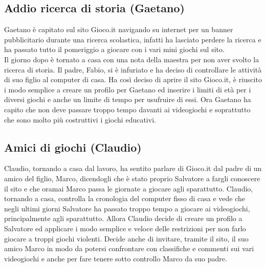 \documentclass[../Report.tex]{subfiles}
\begin{document}
    \subsection{Addio ricerca di storia (Gaetano)}
    Gaetano è capitato sul sito Gioco.it navigando su internet per un banner pubblicitario durante una ricerca scolastica, infatti ha lasciato perdere la ricerca e ha passato tutto il pomeriggio a giocare con i vari mini giochi sul sito.\\
    Il giorno dopo è tornato a casa con una nota della maestra per non aver svolto la ricerca di storia. Il padre, Fabio, si è infuriato e ha deciso di controllare le attività di suo figlio al computer di casa. Ha così deciso di aprire il sito Gioco.it, è riuscito i modo semplice a creare un profilo per Gaetano ed inserire i limiti di età per i diversi giochi e anche un limite di tempo per usufruire di essi. Ora Gaetano ha capito che non deve passare troppo tempo davanti ai videogiochi e soprattutto che sono molto più costruttivi i giochi educativi.

    \subsection{Amici di giochi (Claudio)}
    Claudio, tornando a casa dal lavoro, ha sentito parlare di Gioco.it dal padre di un amico del figlio, Marco, dicendogli che è stato proprio Salvatore a fargli conoscere il sito e che oramai Marco passa le giornate a giocare agli sparattutto. Claudio, tornando a casa, controlla la cronologia del computer fisso di casa e vede che negli ultimi giorni Salvatore ha passato troppo tempo a giocare ai videogiochi, principalmente agli sparattutto. Allora Claudio decide di creare un profilo a Salvatore ed applicare i modo semplice e veloce delle restrizioni per non farlo giocare a troppi giochi violenti. Decide anche di invitare, tramite il sito, il suo amico Marco in modo da potersi confrontare con classifiche e commenti sui vari videogiochi e anche per fare tenere sotto controllo Marco da suo padre.
\end{document}
